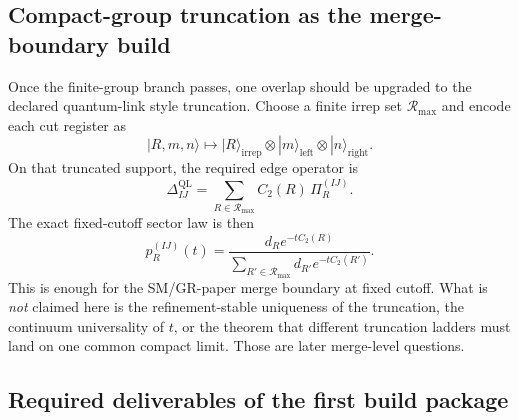 \documentclass[11pt]{article}
\begin{document}
\subsection{Compact-group truncation as the merge-boundary build}

Once the finite-group branch passes, one overlap should be upgraded to the declared
quantum-link style truncation. Choose a finite irrep set $\mathcal R_{\max}$ and encode each cut
register as
\begin{equation}
|R,m,n\rangle
\longmapsto
|R\rangle_{\mathrm{irrep}}
\otimes
|m\rangle_{\mathrm{left}}
\otimes
|n\rangle_{\mathrm{right}}.
\end{equation}
On that truncated support, the required edge operator is
\begin{equation}
\Delta_{IJ}^{\mathrm{QL}}
=
\sum_{R\in \mathcal R_{\max}} C_2(R)\,\Pi_R^{(IJ)}.
\end{equation}
The exact fixed-cutoff sector law is then
\begin{equation}
p_R^{(IJ)}(t)
=
\frac{d_R e^{-tC_2(R)}}{\sum_{R'\in\mathcal R_{\max}} d_{R'} e^{-tC_2(R')}}.
\end{equation}
This is enough for the SM/GR-paper merge boundary at fixed cutoff. What is
\emph{not} claimed here is the refinement-stable uniqueness of the truncation, the continuum
universality of $t$, or the theorem that different truncation ladders must land on one common
compact limit. Those are later merge-level questions.

\subsection{Required deliverables of the first build package}
\end{document}
